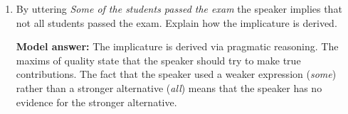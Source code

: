 \documentclass[a4,11pt]{article}
\newcommand{\6}{\mbox{$[\hspace*{-.6mm}[$}}
\newcommand{\9}{\mbox{$]\hspace*{-.6mm}]$}}
\begin{document}
\begin{enumerate}[leftmargin = 12pt]
\item By uttering {\it Some of the students passed the exam} the speaker implies that not all students passed the exam. Explain how the implicature is derived.

{ \bf Model answer:}  The implicature is derived via pragmatic reasoning. The maxims of quality state that the speaker should try to make true contributions. The fact that the speaker used a weaker expression (\textit{some}) rather than a stronger alternative (\textit{all}) means that the speaker has no evidence for the stronger alternative. 


\end{enumerate}
\end{document}

